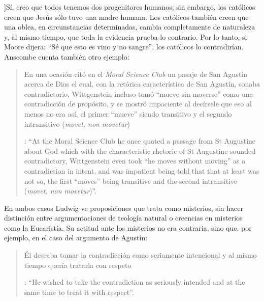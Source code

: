 ]{Sí, creo que todos tenemos dos progenitores humanos; sin embargo, los católicos creen que Jesús sólo tuvo una madre humana. \textelp{} Los católicos también creen que una oblea, en circunstancias determinadas, cambia completamente de naturaleza y, al mismo tiempo, que toda la evidencia prueba lo contrario. Por lo tanto, si Moore dijera: ``Sé que esto es vino y no sangre'', los católicos lo contradirían}. Anscombe cuenta también otro ejemplo:\blockquote[{\Cite[122]{anscombe1981parmenides:qli}}: \enquote{At the Moral Science Club he once quoted a passage from St Augustine about God which with the characteristic rhetoric of St Augustine sounded contradictory, Wittgenstein even took ``he moves without moving'' as a contradiction in intent, and was impatient being told that that at least was not so, the first ``moves'' being transitive and the second intransitive (\emph{movet, non movetur})}.]{En una ocasión citó en el \emph{Moral Science Club} un pasaje de San Agustín acerca de Dios el cual, con la retórica característica de San Agustín, sonaba contradictorio, Wittgenstein incluso tomó ``mueve sin moverse'' como una contradicción de propósito, y se mostró impaciente al decírsele que eso al menos no era así, el primer ``mueve'' siendo transitivo y el segundo intransitivo (\emph{movet, non movetur})}. En ambos casos Ludwig ve proposiciones que trata como misterios, sin hacer distinción entre argumentaciones de teología natural o creencias en misterios como la Eucaristía. Su actitud ante los misterios no era contraria, sino que, por ejemplo, en el caso del argumento de Agustín: \blockquote[{\Cite[122]{anscombe1981parmenides:qli}}: \enquote{He wished to take the contradiction as seriously intended and at the same time to treat it with respect}.]{Él deseaba tomar la contradicción como seriamente intencional y al mismo tiempo quería tratarla con respeto}.

